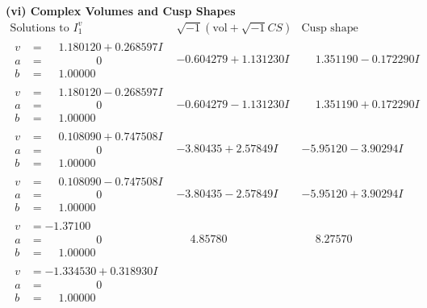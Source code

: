 \documentclass[1p]{elsarticle_modified}
\theoremstyle{definition}
\newcommand{\I}{\sqrt{-1}}
\begin{document}
\newpage\flushleft \textbf{(vi) Complex Volumes and Cusp Shapes}
$$\begin{array}{c|c|c}  
\text{Solutions to }I^v_{1}& \I (\text{vol} + \sqrt{-1}CS) & \text{Cusp shape}\\
 \hline 
\begin{aligned}
v &= \phantom{-}1.180120 + 0.268597 I \\
a &= \phantom{-0.000000 } 0 \\
b &= \phantom{-}1.00000\phantom{ +0.000000I}\end{aligned}
 & -0.604279 + 1.131230 I & \phantom{-}1.351190 - 0.172290 I \\ \hline\begin{aligned}
v &= \phantom{-}1.180120 - 0.268597 I \\
a &= \phantom{-0.000000 } 0 \\
b &= \phantom{-}1.00000\phantom{ +0.000000I}\end{aligned}
 & -0.604279 - 1.131230 I & \phantom{-}1.351190 + 0.172290 I \\ \hline\begin{aligned}
v &= \phantom{-}0.108090 + 0.747508 I \\
a &= \phantom{-0.000000 } 0 \\
b &= \phantom{-}1.00000\phantom{ +0.000000I}\end{aligned}
 & -3.80435 + 2.57849 I & -5.95120 - 3.90294 I \\ \hline\begin{aligned}
v &= \phantom{-}0.108090 - 0.747508 I \\
a &= \phantom{-0.000000 } 0 \\
b &= \phantom{-}1.00000\phantom{ +0.000000I}\end{aligned}
 & -3.80435 - 2.57849 I & -5.95120 + 3.90294 I \\ \hline\begin{aligned}
v &= -1.37100\phantom{ +0.000000I} \\
a &= \phantom{-0.000000 } 0 \\
b &= \phantom{-}1.00000\phantom{ +0.000000I}\end{aligned}
 & \phantom{-}4.85780\phantom{ +0.000000I} & \phantom{-}8.27570\phantom{ +0.000000I} \\ \hline\begin{aligned}
v &= -1.334530 + 0.318930 I \\
a &= \phantom{-0.000000 } 0 \\
b &= \phantom{-}1.00000\phantom{ +0.000000I}\end{aligned}

\end{array}$$
\end{document}
